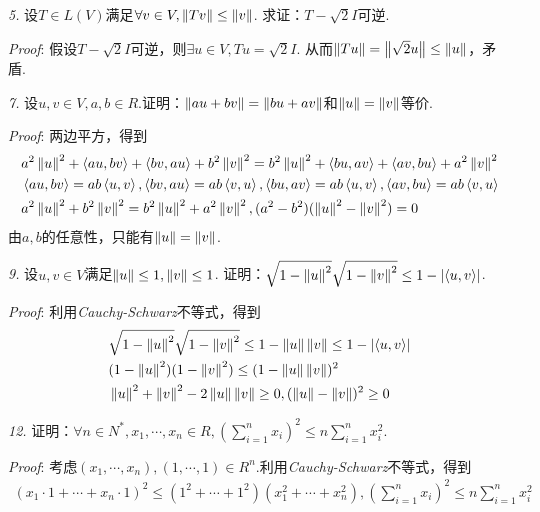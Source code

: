 \textit{5.}
设\(T \in L(V)\)满足\(\forall v \in V,\norm{Tv} \leq \norm{v}\).
求证：\(T-\sqrt{2}I\)可逆.

\textit{Proof}:
假设\(T-\sqrt{2}I\)可逆，则\(\exists u \in V,Tu=\sqrt{2}I\).
从而\(\norm{Tu}=\norm{\sqrt{2}u} \leq \norm{u}\)，矛盾.

\hspace*{\fill}

\textit{7.}
设\(u,v \in V,a,b \in R\).证明：\(\norm{au+bv}=\norm{bu+av}\)和\(\norm{u}=\norm{v}\)等价.

\textit{Proof}:
两边平方，得到
    \begin{align*}
        &a^2\norm{u}^2+\ip{au}{bv}+\ip{bv}{au}+b^2\norm{v}^2=b^2\norm{u}^2+\ip{bu}{av}+\ip{av}{bu}+a^2\norm{v}^2 \\
        &\ip{au}{bv}=ab\ip{u}{v},\ip{bv}{au}=ab\ip{v}{u},\ip{bu}{av}=ab\ip{u}{v},\ip{av}{bu}=ab\ip{v}{u} \\
        &a^2\norm{u}^2+b^2\norm{v}^2=b^2\norm{u}^2+a^2\norm{v}^2,(a^2-b^2)(\norm{u}^2-\norm{v}^2)=0
    \end{align*}
由\(a,b\)的任意性，只能有\(\norm{u}=\norm{v}\).

\hspace*{\fill}

\textit{9.}
设\(u,v \in V\)满足\(\norm{u} \leq 1,\norm{v} \leq 1\).
证明：\(\sqrt{1-\norm{u}^2}\sqrt{1-\norm{v}^2} \leq 1-\abs{\ip{u}{v}}\).

\textit{Proof}:
利用\textit{Cauchy-Schwarz}不等式，得到
    \begin{align*}
        &\sqrt{1-\norm{u}^2}\sqrt{1-\norm{v}^2} \leq 1-\norm{u}\norm{v} \leq 1-\abs{\ip{u}{v}} \\
        &(1-\norm{u}^2)(1-\norm{v}^2) \leq (1-\norm{u}\norm{v})^2 \\
        &\norm{u}^2+\norm{v}^2-2\norm{u}\norm{v} \geq 0,(\norm{u}-\norm{v})^2 \geq 0
    \end{align*}

\hspace*{\fill}

\textit{12.}
证明：\(\forall n \in N^*,x_1,\cdots,x_n \in R,(\sum_{i=1}^n x_i)^2 \leq n\sum_{i=1}^n x_i^2\).

\textit{Proof}:
考虑\((x_1,\cdots,x_n),(1,\cdots,1) \in R^n\).利用\textit{Cauchy-Schwarz}不等式，得到
    \begin{align*}
        (x_1 \cdot 1+\cdots+x_n \cdot 1)^2 \leq (1^2+\cdots+1^2)(x_1^2+\cdots+x_n^2),
        (\sum_{i=1}^n x_i)^2 \leq n\sum_{i=1}^n x_i^2
    \end{align*}

